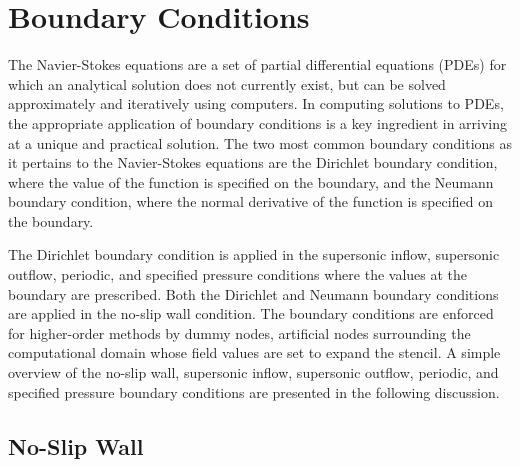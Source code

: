 
\section{Boundary Conditions}

The Navier-Stokes equations are a set of partial differential equations (PDEs) for which an analytical solution does not currently exist, but can be solved approximately and iteratively using computers. In computing solutions to PDEs, the appropriate application of boundary conditions is a key ingredient in arriving at a unique and practical solution. The two most common boundary conditions as it pertains to the Navier-Stokes equations are the Dirichlet boundary condition, where the value of the function is specified on the boundary, and the Neumann boundary condition, where the normal derivative of the function is specified on the boundary. 

The Dirichlet boundary condition is applied in the supersonic inflow, supersonic outflow, periodic, and specified pressure conditions where the values at the boundary are prescribed. Both the Dirichlet and Neumann boundary conditions are applied in the no-slip wall condition. The boundary conditions are enforced for higher-order methods by dummy nodes, artificial nodes surrounding the computational domain whose field values are set to expand the stencil. A simple overview of the no-slip wall, supersonic inflow, supersonic outflow, periodic, and specified pressure boundary conditions are presented in the following discussion.

\subsection{No-Slip Wall}

